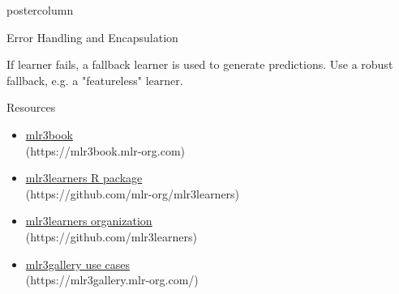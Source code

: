 \documentclass{beamer}
\begin{document}
\begin{withoutheader}
\begin{frame}[fragile]{}
\begin{columns}
\begin{column}{.245\textwidth}
\begin{beamercolorbox}[center]{postercolumn}
\begin{minipage}{.98\textwidth}
{\begin{myblock}{Error Handling and Encapsulation}
\begin{codebox}
								\end{codebox}
								If learner fails, a fallback learner is used to generate predictions.
								Use a robust fallback, e.g. a "featureless" learner.
							\end{myblock}
							\begin{myblock}{Resources}
								\begin{itemize}
									\item \href{https://mlr3book.mlr-org.com/index.html}{mlr3book}\\ (https://mlr3book.mlr-org.com)
									\item \href{https://github.com/mlr-org/mlr3learners}{mlr3learners R package}\\ (https://github.com/mlr-org/mlr3learners)
									\item \href{https://github.com/mlr3learners}{mlr3learners organization}\\ (https://github.com/mlr3learners)
									\item \href{https://mlr3gallery.mlr-org.com/}{mlr3gallery use cases}\\ (https://mlr3gallery.mlr-org.com/)
								\end{itemize}
							\end{myblock}
							\vfill}
					\end{minipage}
				\end{beamercolorbox}
			\end{column}
		\end{columns}
	\end{frame}
\end{withoutheader}
\end{document}
